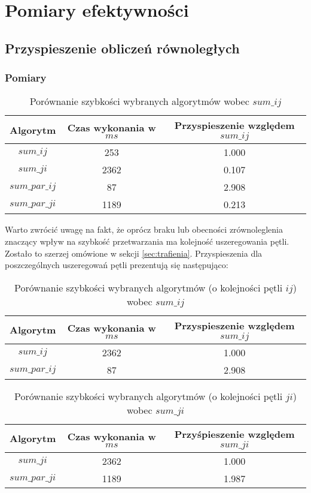 \section{Pomiary efektywności}

\subsection{Przyspieszenie obliczeń równoległych}

\subsubsection{Pomiary}

\begin{table}[H]
\centering
\begin{tabular}{|c|c|c|}
\hline
Algorytm & Czas wykonania w $ms$ & Przyspieszenie względem $sum\_ij$ \\ \hline
$sum\_ij$ & 253 & 1.000 \\ \hline
$sum\_ji$ & 2362 & 0.107 \\ \hline
$sum\_par\_ij$ & 87 & 2.908 \\ \hline
$sum\_par\_ji$ & 1189 & 0.213 \\ \hline
\end{tabular}
\caption{Porównanie szybkości wybranych algorytmów wobec $sum\_ij$}
\end{table}

Warto zwrócić uwagę na fakt, że oprócz braku lub obecności zrównoleglenia znaczący wpływ na szybkość przetwarzania ma kolejność uszeregowania pętli. Zostało to szerzej omówione w sekcji \ref{sec:trafienia}. Przyspieszenia dla poszczególnych uszeregowań pętli prezentują się następująco:

\begin{table}[H]
\centering
\begin{tabular}{|c|c|c|}
\hline
Algorytm & Czas wykonania w $ms$ & Przyspieszenie względem $sum\_ij$ \\ \hline
$sum\_ij$ & 2362 & 1.000 \\ \hline
$sum\_par\_ij$ & 87 & 2.908 \\ \hline
\end{tabular}
\caption{Porównanie szybkości wybranych algorytmów (o kolejności pętli $ij$) wobec $sum\_ij$}
\end{table}

\begin{table}[H]
\centering
\begin{tabular}{|c|c|c|}
\hline
Algorytm & Czas wykonania w $ms$ & Przyśpieszenie względem $sum\_ji$ \\ \hline
$sum\_ji$ & 2362 & 1.000 \\ \hline
$sum\_par\_ji$ & 1189 & 1.987 \\ \hline
\end{tabular}
\caption{Porównanie szybkości wybranych algorytmów (o kolejności pętli $ji$) wobec $sum\_ji$}
\end{table}

